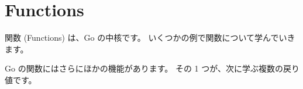 \section{Functions}

関数 (Functions) は、Go の中核です。 いくつかの例で関数について学んでいきます。




Go の関数にはさらにほかの機能があります。 その 1 つが、次に学ぶ複数の戻り値です。